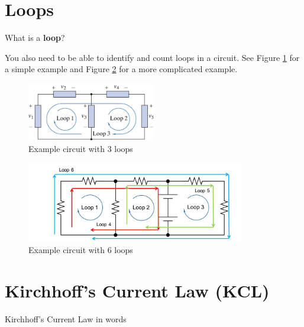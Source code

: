 \documentclass{handout}
\begin{document}
\newpage

\section{Loops}

What is a \textbf{loop}?


You also need to be able to identify and count loops in a circuit. See  Figure \ref{fig: SimpleLoopCounting} for a simple example and Figure \ref{fig: ComplicatedLoopCounting} for a more complicated example.

\begin{figure}[h b t]
\centering
\includegraphics[width=0.5\textwidth]{SimpleLoopCounting.jpg}
\caption{Example circuit with 3 loops}
\label{fig: SimpleLoopCounting}
\end{figure}

\begin{figure}[h b t]
\centering

\includegraphics[width=0.85\textwidth]{ComplicatedLoopCounting.jpg}
\caption{Example circuit with 6 loops}
\label{fig: ComplicatedLoopCounting}
\end{figure}

\newpage

\section{Kirchhoff's Current Law (KCL)}
Kirchhoff's Current Law in words
\end{document}
